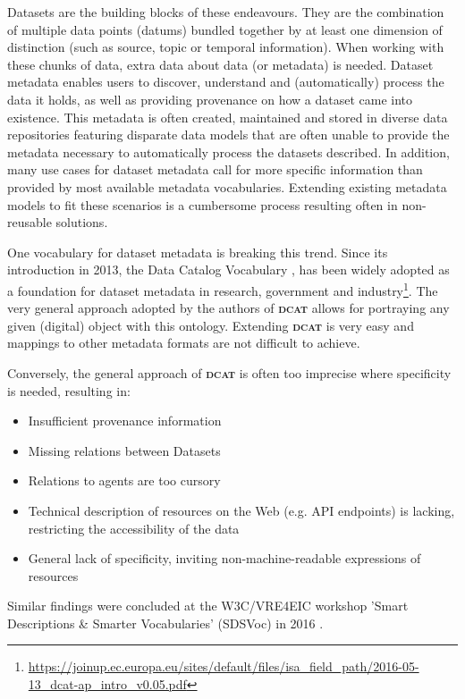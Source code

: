 \documentclass[a4paper,english,twoside,BCOR1.5cm,headsepline,DIV12,appendixprefix,final,12pt]{scrbook}
\newcommand{\dcat}{{\scshape\bfseries dcat}\xspace}
\newcommand\footnoteurl[1]{\footnote{\scriptsize\url{#1}}}
\begin{document}
Datasets are the building blocks of these endeavours. They are the combination of multiple data points (datums) bundled together by at least one dimension of distinction (such as source, topic or temporal information). When working with these chunks of data, extra data about data (or metadata) is needed. Dataset metadata enables users to discover, understand and (automatically) process the data it holds, as well as providing provenance on how a dataset came into existence. 
This metadata is often created, maintained and stored in diverse data repositories featuring disparate data models that are often unable to provide the metadata necessary to automatically process the datasets described. In addition, many use cases for dataset metadata call for more specific information than provided by most available metadata vocabularies. Extending existing metadata models to fit these scenarios is a cumbersome process resulting often in non-reusable solutions. 

One vocabulary for dataset metadata is breaking this trend. 
Since its introduction in 2013, the Data Catalog Vocabulary \cite{ddcat}, has been widely adopted as a foundation for dataset metadata in research, government and industry\footnoteurl{https://joinup.ec.europa.eu/sites/default/files/isa_field_path/2016-05-13_dcat-ap_intro_v0.05.pdf}. The very general approach adopted by the authors of \dcat allows for portraying any given (digital) object with this ontology. Extending \dcat is very easy and mappings to other metadata formats are not difficult to achieve. 

Conversely, the general approach of \dcat is often too imprecise where specificity is needed, resulting in:

\begin{itemize}
\item Insufficient provenance information
\item Missing relations between Datasets
\item Relations to agents are too cursory
\item Technical description of resources on the Web (e.g. API endpoints) is lacking, restricting the accessibility of the data
\item General lack of specificity, inviting non-machine-readable expressions of resources
\end{itemize}
Similar findings were concluded at the W3C/VRE4EIC workshop 'Smart Descriptions \& Smarter Vocabularies' (SDSVoc) in 2016 \cite{sdsvocW3C2016}. 
\end{document}
